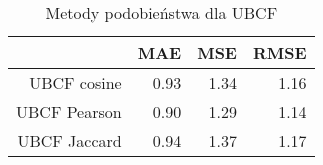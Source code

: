 \begin{table}[ht]
\centering
\begin{tabular}{rrrr}
  \hline
 & MAE & MSE & RMSE \\ 
  \hline
UBCF cosine & 0.93 & 1.34 & 1.16 \\ 
  UBCF Pearson & 0.90 & 1.29 & 1.14 \\ 
  UBCF Jaccard & 0.94 & 1.37 & 1.17 \\ 
   \hline
\end{tabular}
\caption{Metody podobieństwa dla UBCF} 
\end{table}


